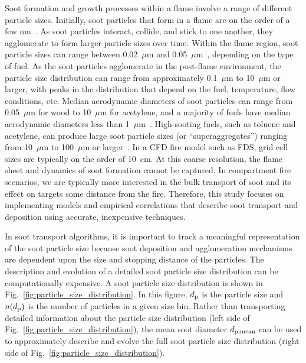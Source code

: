 Soot formation and growth processes within a flame involve a range of different particle sizes. Initially, soot particles that form in a flame are on the order of a few nm~\cite{kennedy1997models}. As soot particles interact, collide, and stick to one another, they agglomerate to form larger particle sizes over time. Within the flame region, soot particle sizes can range between 0.02~$\mu$m and 0.05~$\mu$m~\cite{Butler:2004p433}, depending on the type of fuel. As the soot particles agglomerate in the post-flame environment, the particle size distribution can range from approximately 0.1~$\mu$m to 10~$\mu$m or larger, with peaks in the distribution that depend on the fuel, temperature, flow conditions, etc. Median aerodynamic diameters of soot particles can range from 0.05~$\mu$m for wood to 10~$\mu$m for acetylene, and a majority of fuels have median aerodynamic diameters less than 1~$\mu$m~\cite{Butler:2004p433}. High-sooting fuels, such as toluene and acetylene, can produce large soot particle sizes (or ``superaggregates'') ranging from 10~$\mu$m to 100~$\mu$m or larger~\cite{PhysRevLett.80.1782,doi:10.1021/la034063h,Kearney20123191}. In a CFD fire model such as FDS, grid cell sizes are typically on the order of 10~cm. At this coarse resolution, the flame sheet and dynamics of soot formation cannot be captured. In compartment fire scenarios, we are typically more interested in the bulk transport of soot and its effect on targets some distance from the fire. Therefore, this study focuses on implementing models and empirical correlations that describe soot transport and deposition using accurate, inexpensive techniques.

In soot transport algorithms, it is important to track a meaningful representation of the soot particle size because soot deposition and agglomeration mechanisms are dependent upon the size and stopping distance of the particles. The description and evolution of a detailed soot particle size distribution can be computationally expensive. A soot particle size distribution is shown in Fig.~\ref{fig:particle_size_distribution}. In this figure, $d\sb{p}$ is the particle size and $n(d\sb{p})$ is the number of particles in a given size bin. Rather than transporting detailed information about the particle size distribution (left side of Fig.~\ref{fig:particle_size_distribution}), the mean soot diameter $d\sb{p, mean}$ can be used to approximately describe and evolve the full soot particle size distribution (right side of Fig.~\ref{fig:particle_size_distribution}).


